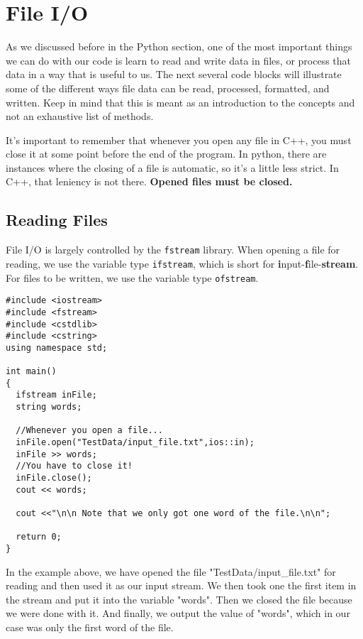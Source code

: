 \section{File I/O}

As we discussed before in the Python section, one of the most important things we can do with our code is learn to read and write data in files, or process that data in a way that is useful to us.  The next several code blocks will illustrate some of the different ways file data can be read, processed, formatted, and written.
Keep in mind that this is meant as an introduction to the concepts and not an exhaustive list of methods.

It's important to remember that whenever you open any file in C++, you must close it at some point before the end of the program.  In python, there are instances where the closing of a file is automatic, so it's a little less strict.  In C++, that leniency is not there.  \textbf{Opened files must be closed.}

\subsection{Reading Files}
File I/O is largely controlled by the \texttt{fstream} library.  When opening a file for reading, we use the variable type \texttt{ifstream}, which is short for \textbf{i}nput-\textbf{f}ile-\textbf{stream}.  For files to be written, we use the variable type \texttt{ofstream}.

\begin{verbatim}
#include <iostream>
#include <fstream>
#include <cstdlib>
#include <cstring>
using namespace std;

int main()
{
  ifstream inFile;
  string words;
  
  //Whenever you open a file...
  inFile.open("TestData/input_file.txt",ios::in);
  inFile >> words;
  //You have to close it!
  inFile.close();
  cout << words;
  
  cout <<"\n\n Note that we only got one word of the file.\n\n";

  return 0;
}
\end{verbatim}

In the example above, we have opened the file "TestData/input\_file.txt" for reading and then used it as our input stream.  We then took one the first item in the stream and put it into the variable "words".  Then we closed the file because we were done with it.  And finally, we output the value of "words", which in our case was only the first word of the file.

